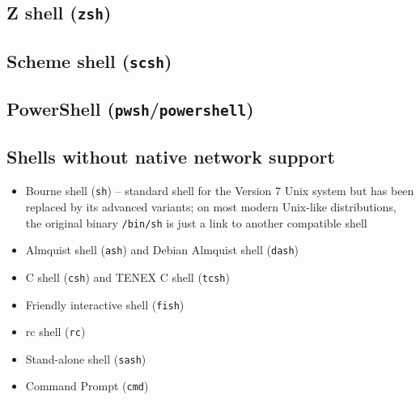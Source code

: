 


\subsection{Z shell (\texttt{zsh})}





\subsection{Scheme shell (\texttt{scsh})}


\subsection{PowerShell (\texttt{pwsh}/\texttt{powershell})}





\subsection{Shells without native network support}

\begin{itemize}
\item Bourne shell (\texttt{sh}) -- standard shell for the Version 7 Unix system but has been replaced by its advanced variants; on most modern Unix-like distributions, the original binary \texttt{/bin/sh} is just a link to another compatible shell
\item Almquist shell (\texttt{ash}) and Debian Almquist shell (\texttt{dash})
\item C shell (\texttt{csh}) and TENEX C shell (\texttt{tcsh})
\item Friendly interactive shell (\texttt{fish})
\item rc shell (\texttt{rc})
\item Stand-alone shell (\texttt{sash})
\item Command Prompt (\texttt{cmd})
\end{itemize}


